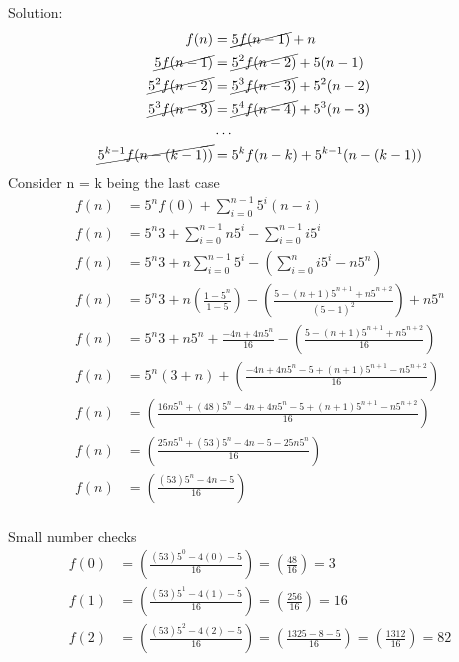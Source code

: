 \documentclass{article}
\begin{document}
\begin{enumerate}
  Solution:
  \begin{align*}
    f(n) &= \cancel{5f(n-1)}+n\\ 
    \cancel{5f(n-1)} &= \cancel{5^2f(n-2)} +5(n-1)\\
    \cancel{5^2f(n-2)} &= \cancel{5^3f(n-3)} +5^2(n-2)\\
    \cancel{5^3f(n-3)} &= \cancel{5^4f(n-4)} +5^3(n-3)\\
    &\ldots\\
    \cancel{5^{k-1} f(n-(k-1))} &= {5^kf(n-k)} +5^{k-1}(n-(k-1))\\
  \end{align*}
  Consider n = k being the last case
  \begin{align*}
    f(n) &= {5^nf(0)} + \sum_{i=0}^{n-1}5^i(n-i) \\
    f(n) &= 5^n3 + \sum_{i=0}^{n-1}n5^i - \sum_{i=0}^{n-1}i5^i \\
    f(n) &= 5^n3 + n\sum_{i=0}^{n-1}5^i - (\sum_{i=0}^{n}i5^i -n5^n) \\
    f(n) &= 5^n3 + n(\frac{1-5^n}{ 1 - 5}) - (\frac{5 - (n +1)5^{n+1} +n5^{n+2}}{ (5 - 1)^2})  + n5^n \\
    f(n) &= 5^n3  + n5^n + \frac{-4n+4n5^n}{ 16} - (\frac{5 - (n +1)5^{n+1} +n5^{n+2}}{ 16})  \\
    f(n) &= 5^n (3  + n) +  (\frac{ -4n+4n5^n - 5 + (n +1)5^{n+1} -n5^{n+2}}{ 16})  \\
    f(n) &=   (\frac{ 16n5^n + (48)5^n   - 4n+4n5^n - 5 + (n +1)5^{n+1} -n5^{n+2}}{ 16})  \\
    f(n) &=   (\frac{ 25n5^n + (53)5^n   - 4n - 5 -25n5^{n}}{ 16})  \\
    f(n) &=   (\frac{ (53)5^n   - 4n - 5 }{ 16})  \\
  \end{align*}
  
  Small number checks
  \begin{align*}
    f(0) &=  (\frac{ (53)5^0   - 4(0) - 5 }{ 16}) = (\frac{ 48 }{ 16}) = 3  \\
    f(1) &=  (\frac{ (53)5^1   - 4(1) - 5 }{ 16})  = (\frac{ 256 }{ 16}) = 16  \\
    f(2) &=  (\frac{ (53)5^2   - 4(2) - 5 }{ 16})  = (\frac{ 1325 - 8 - 5 }{ 16}) = (\frac{ 1312}{ 16})  = 82  \\
  \end{align*}


\end{enumerate}
\end{document}

